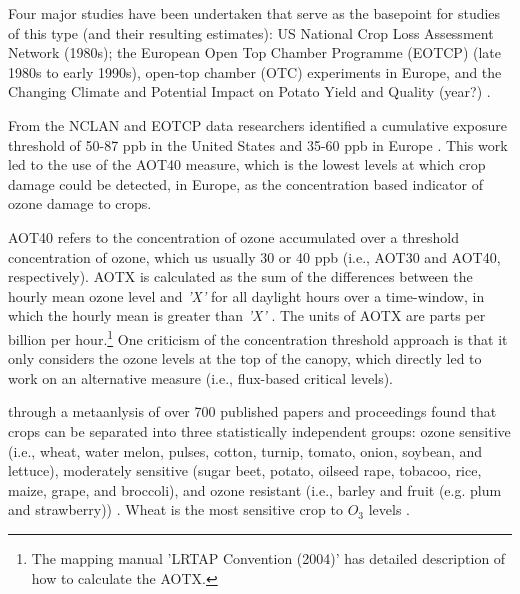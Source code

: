 \documentclass[10pt]{amsart}
\begin{document}
Four major studies have been undertaken that serve as the basepoint for studies of this type (and their resulting estimates): US National Crop Loss Assessment Network (1980s); the European Open Top Chamber Programme (EOTCP) (late 1980s to early 1990s), open-top chamber (OTC) experiments in Europe, and the Changing Climate and Potential Impact on Potato Yield and Quality (year?) \parencite{mills:2007aa}. 

From the NCLAN and EOTCP data researchers identified a cumulative exposure threshold of 50-87 ppb in the United States and 35-60 ppb in Europe \parencite{mills:2007aa}.
This work led to the use of the AOT40 measure, which is the lowest levels at which crop damage could be detected, in Europe, as the concentration based indicator of ozone damage to crops.

AOT40 refers to the concentration of ozone accumulated over a threshold concentration of ozone, which us usually 30 or 40 ppb (i.e., AOT30 and AOT40, respectively). 
AOTX is calculated as the sum of the differences between the hourly mean ozone level and \textit{'X'} for all daylight hours over a time-window, in which the hourly mean is greater than \textit{'X'} \parencite{mills:2007aa}.
The units of AOTX are parts per billion per hour.\footnote{The mapping manual 'LRTAP Convention (2004)' has detailed description of how to calculate the AOTX.}
One criticism of the concentration threshold approach is that it only considers the ozone levels at the top of the canopy, which directly led to work on an alternative measure (i.e., flux-based critical levels). 

\cite{mills:2007aa} through a metaanlysis of over 700 published papers and proceedings found that crops can be separated into three statistically independent groups: ozone sensitive (i.e., wheat, water melon, pulses, cotton, turnip, tomato, onion, soybean, and lettuce), moderately sensitive (sugar beet, potato, oilseed rape, tobacoo, rice, maize, grape, and broccoli), and ozone resistant (i.e., barley and fruit (e.g. plum and strawberry)) \parencite{mills:2007aa}.  
Wheat is the most sensitive crop to $O_{3}$ levels \parencite{mills:2007aa}. 

\begin{landscape}
\begin{table}
\end{table}
\end{landscape}
\end{document}
